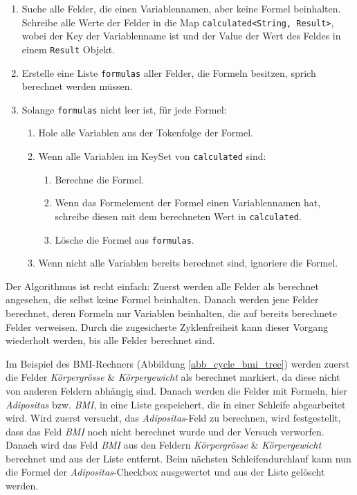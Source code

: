 \begin{enumerate}
	\item Suche alle Felder, die einen Variablennamen, aber keine Formel beinhalten. Schreibe alle Werte der Felder in die Map \texttt{calculated<String, 			Result>}, wobei der Key der Variablenname ist und der Value der Wert des Feldes in einem \texttt{Result} Objekt.
	\item Erstelle eine Liste \texttt{formulas} aller Felder, die Formeln besitzen, sprich berechnet werden müssen.
	\item Solange \texttt{formulas} nicht leer ist, für jede Formel:
	
	\begin{enumerate}
		\item Hole alle Variablen aus der Tokenfolge der Formel.
		\item Wenn alle Variablen im KeySet von \texttt{calculated} sind:
		\begin{enumerate}
			\item Berechne die Formel.
			\item Wenn das Formelement der Formel einen Variablennamen hat, schreibe diesen mit dem berechneten Wert in \texttt{calculated}.
			\item Lösche die Formel aus \texttt{formulas}.
		\end{enumerate}	
		\item Wenn nicht alle Variablen bereits berechnet sind, ignoriere die Formel.
	\end{enumerate}	
	
\end{enumerate}

Der Algorithmus ist recht einfach: Zuerst werden alle Felder als berechnet angesehen, die selbst keine Formel beinhalten. Danach werden jene Felder berechnet, deren Formeln nur Variablen beinhalten, die auf bereits berechnete Felder verweisen. Durch die zugesicherte Zyklenfreiheit kann dieser Vorgang wiederholt werden, bis alle Felder berechnet sind.

Im Beispiel des BMI-Rechners (Abbildung \ref{abb_cycle_bmi_tree}) werden zuerst die Felder \emph{Körpergrösse} \& \emph{Körpergewicht} als berechnet markiert, da diese nicht von anderen Feldern abhängig sind. Danach werden die Felder mit Formeln, hier \emph{Adipositas} bzw. \emph{BMI}, in eine Liste ge\-spei\-chert, die in einer Schleife abgearbeitet wird. Wird zuerst versucht, das \emph{Adipositas}-Feld zu berechnen, wird festgestellt, dass das Feld \emph{BMI} noch nicht berechnet wurde und der Versuch verworfen. Danach wird das Feld \emph{BMI} aus den Feldern \emph{Körpergrösse} \& \emph{Körpergewicht} berechnet und aus der Liste entfernt. Beim nächsten Schleifendurchlauf kann nun die Formel der \emph{Adipositas}-Checkbox ausgewertet und aus der Liste gelöscht werden.

